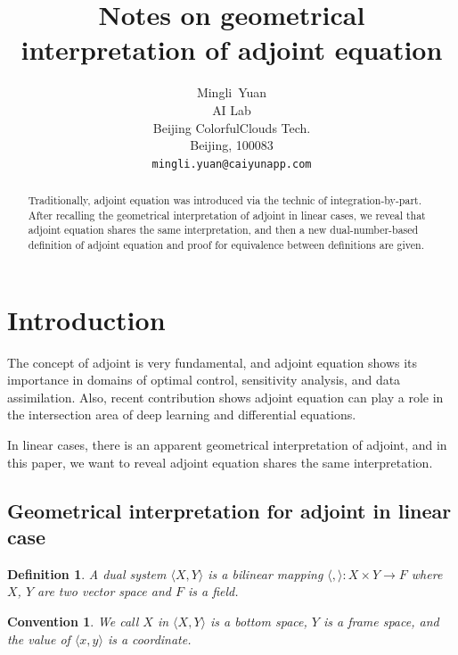 \documentclass{article}
\title{Notes on geometrical interpretation of adjoint equation}
\author{
  Mingli~Yuan \\
  AI Lab \\
  Beijing ColorfulClouds Tech.\\
  Beijing, 100083 \\
  \texttt{mingli.yuan@caiyunapp.com} \\
}
\newtheorem{definition}{Definition}
\newtheorem{convention}{Convention}
\begin{document}
\maketitle

\begin{abstract}
Traditionally, adjoint equation was introduced via the technic of integration-by-part.
After recalling the geometrical interpretation of adjoint in linear cases,
we reveal that adjoint equation shares the same interpretation,
and then a new dual-number-based definition of adjoint equation and proof for equivalence between definitions are given.
\end{abstract}


\section{Introduction}

The concept of adjoint is very fundamental, and adjoint equation shows its importance in domains of optimal control, sensitivity analysis, and data assimilation. Also, recent contribution shows adjoint equation can play a role in the intersection area of deep learning and differential equations.

In linear cases, there is an apparent geometrical interpretation of adjoint, and in this paper, we want to reveal adjoint equation shares the same interpretation.

\subsection{Geometrical interpretation for adjoint in linear case}

\begin{definition}
\label{d0}
A dual system $ \langle X, Y \rangle $ is a bilinear mapping $ \langle , \rangle : X \times Y \to F $ where $X$, $Y$ are two vector space and $ F $ is a field.
\end{definition}

\begin{convention}
We call $ X $ in $ \langle X, Y \rangle $ is a bottom space, $ Y $ is a frame space, and the value of $ \langle x, y \rangle $ is a coordinate.
\end{convention}
\end{document}
